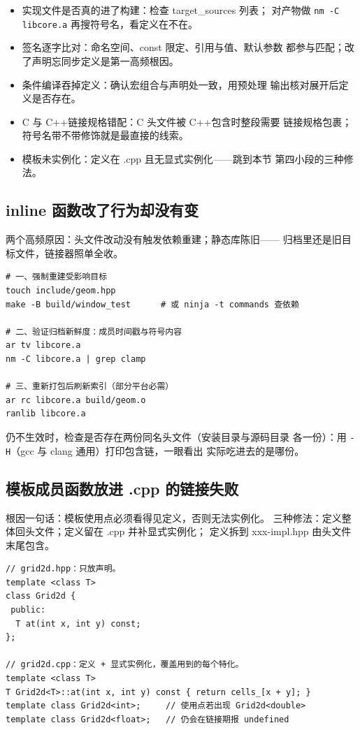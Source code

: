 \documentclass[12pt,a4paper,fontset=fandol]{ctexbook}
\newcommand{\Tp}[1]{\texttt{#1}}
\newcommand{\Lang}[1]{\textsf{#1}}
\newcommand{\CPP}{\Lang{C++}}
\begin{document}
\begin{itemize}
\item 实现文件是否真的进了构建：检查 target\_sources 列表；
      对产物做 \Tp{nm -C libcore.a} 再搜符号名，看定义在不在。
\item 签名逐字比对：命名空间、const 限定、引用与值、默认参数
      都参与匹配；改了声明忘同步定义是第一高频根因。
\item 条件编译吞掉定义：确认宏组合与声明处一致，用预处理
      输出核对展开后定义是否存在。
\item C 与 \CPP 链接规格错配：C 头文件被 \CPP 包含时整段需要
      链接规格包裹；符号名带不带修饰就是最直接的线索。
\item 模板未实例化：定义在 .cpp 且无显式实例化——跳到本节
      第四小段的三种修法。
\end{itemize}

\subsection{inline 函数改了行为却没有变}

两个高频原因：头文件改动没有触发依赖重建；静态库陈旧——
归档里还是旧目标文件，链接器照单全收。

\begin{lstlisting}[style=shellstyle]
# 一、强制重建受影响目标
touch include/geom.hpp
make -B build/window_test      # 或 ninja -t commands 查依赖

# 二、验证归档新鲜度：成员时间戳与符号内容
ar tv libcore.a
nm -C libcore.a | grep clamp

# 三、重新打包后刷新索引（部分平台必需）
ar rc libcore.a build/geom.o
ranlib libcore.a
\end{lstlisting}

仍不生效时，检查是否存在两份同名头文件（安装目录与源码目录
各一份）：用 \Tp{-H}（gcc 与 clang 通用）打印包含链，一眼看出
实际吃进去的是哪份。

\subsection{模板成员函数放进 .cpp 的链接失败}

根因一句话：模板使用点必须看得见定义，否则无法实例化。
三种修法：定义整体回头文件；定义留在 .cpp 并补显式实例化；
定义拆到 xxx-impl.hpp 由头文件末尾包含。

\begin{lstlisting}[style=cppstyle]
// grid2d.hpp：只放声明。
template <class T>
class Grid2d {
 public:
  T at(int x, int y) const;
};

// grid2d.cpp：定义 + 显式实例化，覆盖用到的每个特化。
template <class T>
T Grid2d<T>::at(int x, int y) const { return cells_[x + y]; }
template class Grid2d<int>;     // 使用点若出现 Grid2d<double>
template class Grid2d<float>;   // 仍会在链接期报 undefined
\end{lstlisting}
\end{document}
